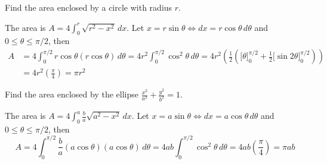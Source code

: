 \begin{problem}
    Find the area enclosed by a circle with radius \(r\).
\end{problem}
\begin{solution}
    The area is \(\displaystyle{A=4\int_0^r\sqrt{r^2-x^2}\,dx}\).
    Let \(x=r\sin\theta\iff dx=r\cos\theta\,d\theta\) and
    \(0\leq\theta\leq\pi/2\), then
    \begin{align*}
        A &= 4\int_0^{\pi/2}r\cos\theta(r\cos\theta)\,d\theta
        =4r^2\int_0^{\pi/2}\cos^2\theta\,d\theta
        =4r^2\left(\frac{1}{2}\left(\big[\theta\big]_0^{\pi/2}
        +\frac{1}{2}\big[\sin2\theta\big]_0^{\pi/2}\right)\right) \\
        &= 4r^2\left(\frac{\pi}{4}\right)=\pi r^2
    \end{align*}
\end{solution}
\begin{problem}
    Find the area enclosed by the ellipse
    \(\displaystyle{\frac{x^2}{a^2}+\frac{y^2}{b^2}}=1\).
\end{problem}
\begin{solution}
    The area is \(\displaystyle{A=4\int_0^a\frac{b}{a}\sqrt{a^2-x^2}\,dx}\).
    Let \(x=a\sin\theta\iff dx=a\cos\theta\,d\theta\) and
    \(0\leq\theta\leq\pi/2\), then
    \[A=4\int_0^{\pi/2}\frac{b}{a}(a\cos\theta)(a\cos\theta)\,d\theta
    =4ab\int_0^{\pi/2}\cos^2\theta\,d\theta
    =4ab\left(\frac{\pi}{4}\right)=\pi ab\]
\end{solution}
